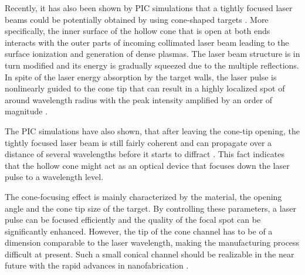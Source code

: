 Recently, it has also been shown by PIC simulations that a tightly focused laser beams could be potentially obtained by using cone-shaped targets \cite{Levy2011, Yu2010, Zeng2012, Cao2008}. More specifically, the inner surface of the hollow cone that is open at both ends interacts with the outer parts of incoming collimated laser beam leading to the surface ionization and generation of dense plasmas. The laser beam structure is in turn modified and its energy is gradually squeezed due to the multiple reflections. In spite of the laser energy absorption by the target walls, the laser pulse is nonlinearly guided to the cone tip that can result in a highly localized spot of around wavelength radius with the peak intensity amplified by an order of magnitude \cite{Zeng2012}.

The PIC simulations have also shown, that after leaving the cone-tip opening, the tightly focused laser beam is still fairly coherent and can propagate over a distance of several wavelengths before it starts to diffract \cite{Yu2010}. This fact indicates that the hollow cone might act as an optical device that focuses down the laser pulse to a wavelength level.

The cone-focusing effect is mainly characterized by the material, the opening angle and the cone tip size of the target. By controlling these parameters, a laser pulse can be focused efficiently and the quality of the focal spot can be significantly enhanced. However, the tip of the cone channel has to be of a dimension comparable to the laser wavelength, making the manufacturing process difficult at present. Such a small conical channel should be realizable in the near future with the rapid advances in nanofabrication \cite{Cao2008}.